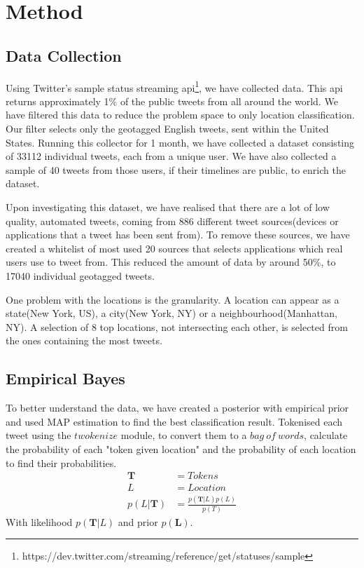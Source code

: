 \documentclass[twoside,11pt]{article}
\begin{document}
\section{Method}
\subsection{Data Collection}
Using Twitter's sample status streaming api\footnote{https://dev.twitter.com/streaming/reference/get/statuses/sample}, we have collected data. This api returns approximately 1\% of the public tweets from all around the world. We have filtered this data to reduce the problem space to only location classification. Our filter selects only the geotagged English tweets, sent within the United States. Running this collector for 1 month, we have collected a dataset consisting of 33112 individual tweets, each from a unique user. We have also collected a sample of 40 tweets from those users, if their timelines are public, to enrich the dataset. 

Upon investigating this dataset, we have realised that there are a lot of low quality, automated tweets, coming from 886 different tweet sources(devices or applications that a tweet has been sent from). To remove these sources, we have created a whitelist of most used 20 sources that selects applications which real users use to tweet from. This reduced the amount of data by around 50\%, to 17040 individual geotagged tweets. 

One problem with the locations is the granularity. A location can appear as a state(New York, US), a city(New York, NY) or a neighbourhood(Manhattan, NY). A selection of 8 top locations, not intersecting each other, is selected from the ones containing the most tweets.

\subsection{Empirical Bayes}
To better understand the data, we have created a posterior with empirical prior\cite{carlin1997bayes} and used MAP estimation\cite{degrooth} to find the best classification result. Tokenised each tweet using the $twokenize$ module\cite{gimpel2011part}, to convert them to a $bag\ of\ words$, calculate the probability of each "token given location" and the probability of each location to find their probabilities. 
\begin{equation*}
\begin{split}
\mathbf{T} &= Tokens \\
L &= Location \\
p(L|\mathbf{T}) &= \frac{p(\mathbf{T} | L)p(L)}{p(T)}
\end{split}
\end{equation*}
With likelihood $p(\mathbf{T} | L)$ and prior $p(\mathbf{L})$. 
\end{document}
